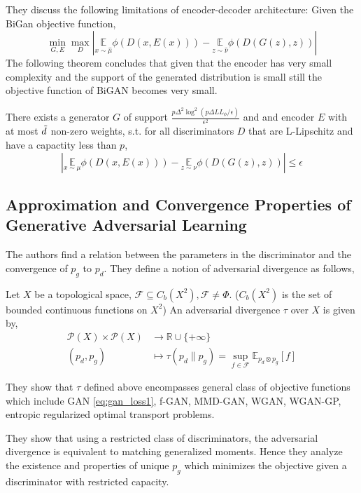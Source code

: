 They discuss the following limitations of encoder-decoder architecture: Given the BiGan objective function,
    $$
\min _{G, E} \max _{D}|\underset{x \sim \hat{\mu}}{\mathbb{E}} \phi(D(x, E(x)))-\underset{z \sim \hat{\nu}}{\mathbb{E}} \phi(D(G(z), z))|
$$
The following theorem concludes that given that the encoder has very small complexity and the support of the generated distribution is small still the objective function of BiGAN becomes very small.
\begin{theorem}
There exists a generator $G$ of support $\frac{p \Delta^{2} \log ^{2}\left(p \Delta L L_{\phi} / \epsilon\right)}{\epsilon^{2}}$ and and encoder $E$ with at most $\Tilde{d}$ non-zero weights, s.t. for all discriminators $D$ that are L-Lipschitz and have a capactity less than $p$, $$
|\underset{x \sim \mu}{\mathbb{E}} \phi(D(x, E(x)))-\underset{z \sim \nu}{\mathbb{E}} \phi(D(G(z), z))| \leq \epsilon
$$
\end{theorem}

\subsection*{Approximation and Convergence Properties of Generative Adversarial Learning \citep{app_conv}}
The authors find a relation between the parameters in the discriminator and the convergence of $p_g$ to $p_d$.
They define a notion of adversarial divergence as follows,
\begin{definition}
\label{def:adv_div}
Let $X$ be a topological space, $\mathcal{F} \subseteq C_b(X^2), \mathcal{F} \neq \Phi$. ($C_b(X^2)$ is the set of bounded continuous functions on $X^2$) An adversarial divergence $\tau$ over $X$ is given by,
$$
\begin{aligned} \mathcal{P}(X) \times \mathcal{P}(X) & \longrightarrow \mathbb{R} \cup\{+\infty\} \\(p_d, p_g) & \longmapsto \tau(p_d \| p_g)=\sup _{f \in \mathcal{F}} \mathbb{E}_{p_d \otimes p_g}[f] \end{aligned}
$$

They show that $\tau$ defined above encompasses general class of objective functions which include GAN \ref{eq:gan_loss1}, f-GAN, MMD-GAN, WGAN, WGAN-GP, entropic regularized optimal transport problems.

They show that using a restricted class of discriminators, the adversarial divergence is equivalent to matching generalized moments. Hence they analyze the existence and properties of unique $p_g$ which minimizes the objective given a discriminator with restricted capacity.


\end{definition}{}



